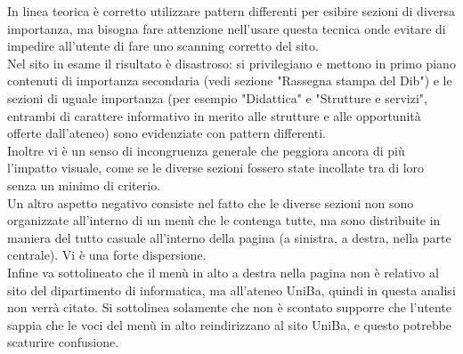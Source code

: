 In linea teorica è corretto utilizzare pattern differenti per esibire sezioni di diversa importanza, ma bisogna fare attenzione nell'usare questa tecnica onde evitare di impedire all'utente di fare uno scanning corretto del sito. \\
Nel sito in esame il risultato è disastroso: si privilegiano e mettono in primo piano contenuti di importanza secondaria (vedi sezione "Rassegna stampa del Dib") e le sezioni di uguale importanza (per esempio "Didattica" e "Strutture e servizi", entrambi di carattere informativo in merito alle strutture e alle opportunità offerte dall'ateneo) sono evidenziate con pattern differenti.\\
Inoltre vi è un senso di incongruenza generale che peggiora ancora di più l'impatto visuale, come se le diverse sezioni fossero state incollate tra di loro senza un minimo di criterio.\\
Un altro aspetto negativo consiste nel fatto che le diverse sezioni non sono organizzate all'interno di un menù che le contenga tutte, ma sono distribuite in maniera del tutto casuale all'interno della pagina (a sinistra, a destra, nella parte centrale). Vi è una forte dispersione.\\
Infine va sottolineato che il menù in alto a destra nella pagina non è relativo al sito del dipartimento di informatica, ma all'ateneo UniBa, quindi in questa analisi non verrà citato. Si sottolinea solamente che non è scontato supporre che l'utente sappia che le voci del menù in alto reindirizzano al sito UniBa, e questo potrebbe scaturire confusione.



